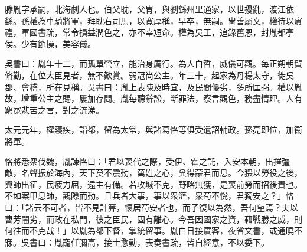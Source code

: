 
\begin{pinyinscope}
滕胤字承嗣，北海劇人也。伯父耽，父冑，與劉繇州里通家，以世擾亂，渡江依繇。孫權為車騎將軍，拜耽右司馬，以寬厚稱，早卒，無嗣。冑善屬文，權待以賔禮，軍國書疏，常令損益潤色之，亦不幸短命。權為吳王，追錄舊恩，封胤都亭侯。少有節操，美容儀。

吳書曰：胤年十二，而孤單煢立，能治身厲行。為人白晢，威儀可觀。每正朔朝賀脩勤，在位大臣見者，無不歎賞。弱冠尚公主。年三十，起家為丹楊太守，徙吳郡、會稽，所在見稱。吳書曰：胤上表陳及時宜，及民間優劣，多所匡弼。權以胤故，增重公主之賜，屢加存問。胤每聽辭訟，斷罪法，察言觀色，務盡情理。人有窮冤悲苦之言，對之流涕。

太元元年，權寢疾，詣都，留為太常，與諸葛恪等俱受遺詔輔政。孫亮即位，加衞將軍。

恪將悉衆伐魏，胤諫恪曰：「君以喪代之際，受伊、霍之託，入安本朝，出摧彊敵，名聲振於海內，天下莫不震動，萬姓之心，兾得蒙君而息。今猥以勞役之後，興師出征，民疲力屈，遠主有備。若攻城不克，野略無獲，是喪前勞而招後責也。不如案甲息師，觀隙而動。且兵者大事，事以衆濟，衆苟不恱，君獨安之？」恪曰：「諸云不可者，皆不見計筭，懷居苟安者也，而子復以為然，吾何望焉？夫以曹芳闇劣，而政在私門，彼之臣民，固有離心。今吾因國家之資，藉戰勝之威，則何往而不克哉！」以胤為都下督，掌統留事。胤白日接賔客，夜省文書，或通曉不寐。吳書曰：胤寵任彌高，接士愈勤，表奏書疏，皆自經意，不以委下。


\end{pinyinscope}